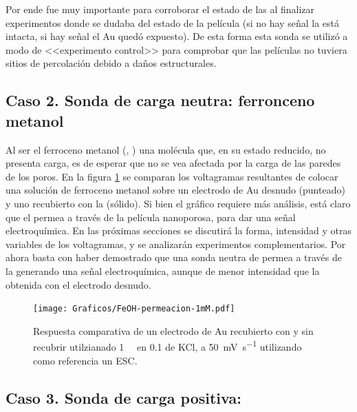 	 Por ende fue muy importante para corroborar el estado de las \pdm\space al finalizar experimentos donde se dudaba del estado de la película (si no hay señal la \pdm está intacta, si hay señal el Au quedó expuesto). De esta forma esta sonda se utilizó a modo de <<experimento control>> para comprobar que las películas no tuviera sitios de percolación debido a daños estructurales.

	\subsection{Caso 2. Sonda de carga neutra: ferronceno metanol}

		Al ser el ferroceno metanol (\ferroceno, \fc) una molécula que, en su estado reducido, no presenta carga, es de esperar que no se vea afectada por la carga de las paredes de los poros. En la figura \ref{fig:permeacion} se comparan los voltagramas resultantes de colocar una solución de ferroceno metanol sobre un electrodo de Au desnudo (punteado) y uno recubierto con la \pdm\space (sólido).  Si bien el gráfico  requiere más análisis, está claro que el \fc\space permea a través de la película nanoporosa, para dar una señal electroquímica. En las próximas secciones se discutirá la forma, intensidad y otras variables de los voltagramas, y se analizarán experimentos complementarios. Por ahora basta con haber demostrado que una sonda neutra de permea a través de la \pdm\space generando una señal electroquímica, aunque de menor intensidad que la obtenida con el electrodo desnudo.

		\begin{figure}[ht]
				\centering
		 	    \texttt{[image: Graficos/FeOH-permeacion-1mM.pdf]}
		        \caption[Permeación ferroceno metanol en \pdmF]{Respuesta comparativa de un electrodo de Au recubierto con \pdmF\space y sin recubrir utilzianado \fc\space \SI{1}{\milli\Molar} en \SI{0.1}{\Molar} de KCl, a \SI{50}{\milli\volt\per\second} utilizando como referencia un ESC.}
		        \label{fig:permeacion}
		      	\end{figure}

	\subsection{Caso 3. Sonda de carga positiva: \texorpdfstring{\aminorutenioCompleto}{aminorutenio}}

